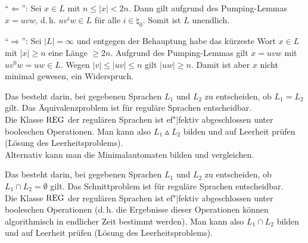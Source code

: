 \begin{Beweis}
    "`$\Leftarrow$"':
    Sei $x \in L$ mit $n \le |x| < 2n$.
    Dann gilt aufgrund des Pumping-Lemmas $x = uvw$, d.\,h.
    $uv^i w \in L$ für alle $i \in \natural_0$.
    Somit ist $L$ unendlich.
    
    "`$\Rightarrow$"':
    Sei $|L| = \infty$ und entgegen der Behauptung habe das kürzeste Wort
    $x \in L$ mit $|x| \ge n$ eine Länge $\ge 2n$.
    Aufgrund des Pumping-Lemmas gilt $x = uvw$ mit $uv^0 w = uw \in L$.
    Wegen $|v| \le |uv| \le n$ gilt $|uw| \ge n$.
    Damit ist aber $x$ nicht minimal gewesen, ein Widerspruch.
\end{Beweis}

\linie

\begin{Bem}
    Das  besteht darin, bei gegebenen Sprachen $L_1$
    und $L_2$ zu entscheiden, ob $L_1 = L_2$ gilt.
    Das Äquivalenzproblem ist für reguläre Sprachen entscheidbar.\\
    Die Klasse $\text{REG}$ der regulären Sprachen ist ef"|fektiv abgeschlossen
    unter booleschen Operationen.
    Man kann also $L_1 \vartriangle L_2$ bilden und auf Leerheit prüfen
    (Lösung des Leerheitsproblems).\\
    Alternativ kann man die Minimalautomaten bilden und vergleichen.
\end{Bem}

\linie

\begin{Bem}
    Das  besteht darin, bei gegebenen Sprachen $L_1$
    und $L_2$ zu entscheiden, ob $L_1 \cap L_2 = \emptyset$ gilt.
    Das Schnittproblem ist für reguläre Sprachen entscheidbar.\\
    Die Klasse $\text{REG}$ der regulären Sprachen ist ef"|fektiv abgeschlossen
    unter booleschen Operationen
    (d.\,h. die Ergebnisse dieser Operationen können algorithmisch in
    endlicher Zeit bestimmt werden).
    Man kann also $L_1 \cap L_2$ bilden und auf Leerheit prüfen
    (Lösung des Leerheitsproblems).
\end{Bem}

\pagebreak
